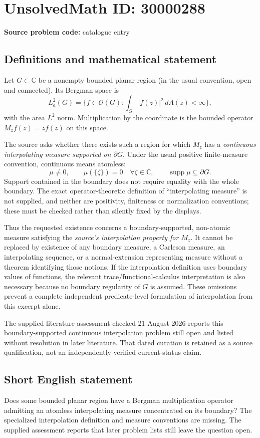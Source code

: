\documentclass[11pt]{article}
\newcommand{\C}{\mathbb{C}}
\begin{document}
\section*{UnsolvedMath ID: 30000288}
\textbf{Source problem code:} catalogue entry
\subsection{Definitions and mathematical statement}
Let $G\subset\C$ be a nonempty bounded planar region (in the usual convention, open and connected). Its Bergman space is
\[
 L_a^2(G)=\{f\in\mathcal O(G):\int_G|f(z)|^2\,dA(z)<\infty\},
\]
with the area $L^2$ norm. Multiplication by the coordinate is the bounded operator $M_zf(z)=zf(z)$ on this space.

The source asks whether there exists such a region for which $M_z$ has a \emph{continuous interpolating measure supported on $\partial G$}. Under the usual positive finite-measure convention, continuous means atomless:
\[
 \mu\ne0,\qquad \mu(\{\zeta\})=0\quad\forall\zeta\in\C,
 \qquad \operatorname{supp}\mu\subseteq\partial G.
\]
Support contained in the boundary does not require equality with the whole boundary. The exact operator-theoretic definition of ``interpolating measure'' is not supplied, and neither are positivity, finiteness or normalization conventions; these must be checked rather than silently fixed by the displays.

Thus the requested existence concerns a boundary-supported, non-atomic measure satisfying the \emph{source's interpolation property for $M_z$}. It cannot be replaced by existence of any boundary measure, a Carleson measure, an interpolating sequence, or a normal-extension representing measure without a theorem identifying those notions. If the interpolation definition uses boundary values of functions, the relevant trace/functional-calculus interpretation is also necessary because no boundary regularity of $G$ is assumed. These omissions prevent a complete independent predicate-level formulation of interpolation from this excerpt alone.

The supplied literature assessment checked 21 August 2026 reports this boundary-supported continuous interpolation problem still open and listed without resolution in later literature. That dated curation is retained as a source qualification, not an independently verified current-status claim.
\subsection{Short English statement}
Does some bounded planar region have a Bergman multiplication operator admitting an atomless interpolating measure concentrated on its boundary? The specialized interpolation definition and measure conventions are missing. The supplied assessment reports that later problem lists still leave the question open.
\end{document}
